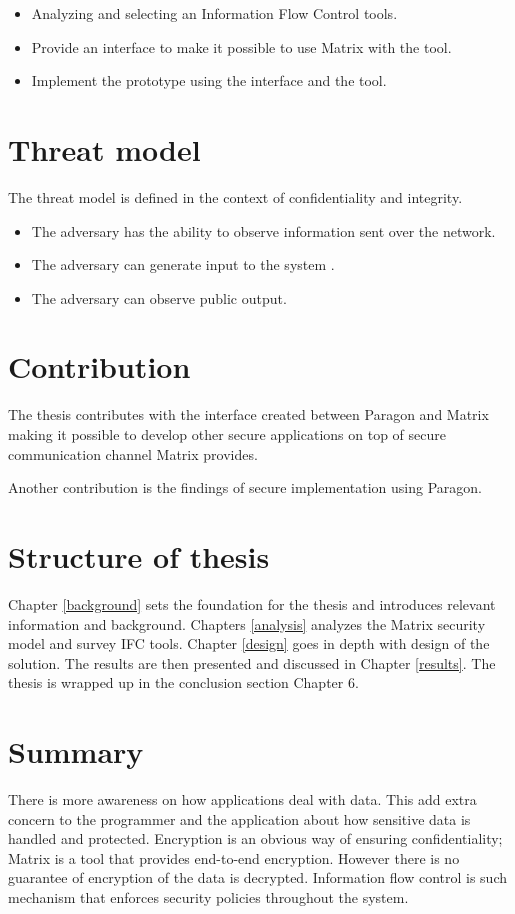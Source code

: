 \begin{itemize}
	\item Analyzing and selecting an Information Flow Control tools.
	\item Provide an interface to make it possible to use Matrix with the tool. 
	\item Implement the prototype using the interface and the tool.
\end{itemize}

 
 \section{Threat model}
 The threat model is defined in the context of confidentiality and integrity.
 \begin{itemize}
 	\item The adversary has the ability to observe information sent over the network.
 	\item The adversary can generate input to the system .
 	\item The adversary can observe public output.   
 \end{itemize}
 
 
 
 
\section{Contribution} %


The thesis contributes with the interface created between Paragon and Matrix making it possible to develop other secure applications on top of secure communication channel Matrix provides. 

Another contribution is the findings of secure implementation using Paragon.

 
 
\section{Structure of thesis} %

Chapter \ref{background} sets the foundation for the thesis and introduces relevant information and background. Chapters \ref{analysis} analyzes the Matrix security model and survey IFC tools. Chapter \ref{design} goes in depth with design of the solution. The results are then presented and discussed in Chapter \ref{results}. The thesis is wrapped up in the conclusion section Chapter 6. 
 
\section{Summary}
There is more awareness on how applications deal with data. This add extra concern to the programmer and the application about how sensitive data is handled and protected. Encryption is an obvious way of ensuring confidentiality; Matrix is a tool that provides end-to-end encryption. However there is no guarantee of encryption of the data is decrypted. Information flow control is such mechanism that enforces security policies throughout the system.

